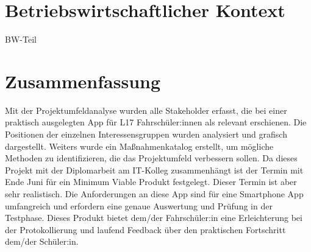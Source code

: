 \chapter{Betriebswirtschaftlicher Kontext}
BW-Teil

\chapter{Zusammenfassung}
Mit der Projektumfeldanalyse wurden alle Stakeholder erfasst, die bei einer praktisch ausgelegten App für L17 Fahrschüler:innen als relevant erschienen. Die Positionen der einzelnen Interessensgruppen wurden analysiert und grafisch dargestellt. Weiters wurde ein Maßnahmenkatalog erstellt, um mögliche Methoden zu identifizieren, die das Projektumfeld verbessern sollen. Da dieses Projekt mit der Diplomarbeit am IT-Kolleg zusammenhängt ist der Termin mit Ende Juni für ein Minimum Viable Produkt festgelegt. Dieser Termin ist aber sehr realistisch. Die Anforderungen an diese App sind für eine Smartphone App umfangreich und erfordern eine genaue Auswertung und Prüfung in der Testphase. Dieses Produkt bietet dem/der Fahrschüler:in eine Erleichterung bei der Protokollierung und laufend Feedback über den praktischen Fortschritt dem/der Schüler:in.
